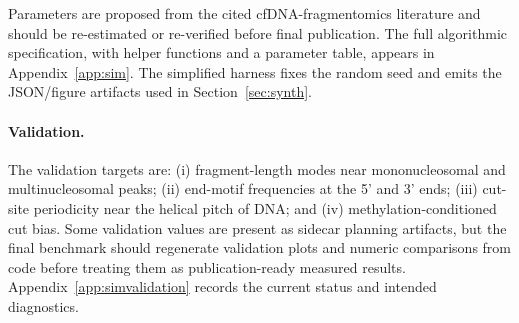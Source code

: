 Parameters are proposed from the cited cfDNA-fragmentomics literature and should be re-estimated or re-verified before final publication. The full algorithmic specification, with helper functions and a parameter table, appears in Appendix~\ref{app:sim}. The simplified harness fixes the random seed and emits the JSON/figure artifacts used in Section~\ref{sec:synth}.

\paragraph{Validation.} The validation targets are: (i) fragment-length modes near mononucleosomal and multinucleosomal peaks; (ii) end-motif frequencies at the 5' and 3' ends; (iii) cut-site periodicity near the helical pitch of DNA; and (iv) methylation-conditioned cut bias. Some validation values are present as sidecar planning artifacts, but the final benchmark should regenerate validation plots and numeric comparisons from code before treating them as publication-ready measured results. Appendix~\ref{app:simvalidation} records the current status and intended diagnostics.

